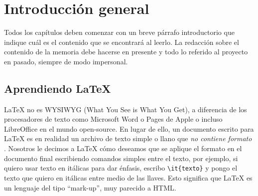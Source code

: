 
\chapter{Introducción general} %

\label{Chapter1} %
\label{IntroGeneral}

Todos los capítulos deben comenzar con un breve párrafo introductorio que indique cuál es el contenido que se encontrará al leerlo.  La redacción sobre el contenido de la memoria debe hacerse en presente y todo lo referido al proyecto en pasado, siempre de modo impersonal.


\newcommand{\keyword}[1]{\textbf{#1}}
\newcommand{\tabhead}[1]{\textbf{#1}}
\newcommand{\code}[1]{\texttt{#1}}
\newcommand{\file}[1]{\texttt{\bfseries#1}}
\newcommand{\option}[1]{\texttt{\itshape#1}}
\newcommand{\grados}{$^{\circ}$}



\section{Aprendiendo \LaTeX{}}

\LaTeX{} no es \textsc{WYSIWYG} (What You See is What You Get), a diferencia de los procesadores de texto como Microsoft Word o Pages de Apple o incluso LibreOffice en el mundo open-source. En lugar de ello, un documento escrito para \LaTeX{} es en realidad un archivo de texto simple o llano que \emph{no contiene formato} . Nosotros le decimos a \LaTeX{} cómo deseamos que se aplique el formato en el documento final escribiendo comandos simples entre el texto, por ejemplo, si quiero usar texto en itálicas para dar énfasis, escribo \verb|\it{texto}| y pongo el texto que quiero en itálicas entre medio de las llaves. Esto significa que \LaTeX{} es un lenguaje del tipo \enquote{mark-up}, muy parecido a HTML.


